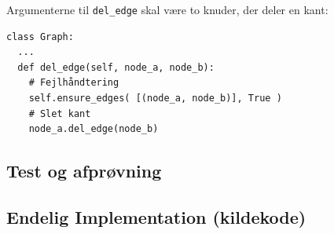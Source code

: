 \documentclass[10pt,a4paper,danish]{article}
\newcommand{\ct}{\texttt}
\begin{document}
Argumenterne til \ct{del\_edge} skal være to knuder, der deler en
kant:
{\small
\begin{verbatim}
class Graph:
  ...
  def del_edge(self, node_a, node_b):
    # Fejlhåndtering
    self.ensure_edges( [(node_a, node_b)], True )
    # Slet kant
    node_a.del_edge(node_b)
\end{verbatim}}


\subsection{Test og afprøvning}


\subsection{Endelig Implementation (kildekode)}
\begin{alltt}

\end{alltt}
\end{document}

